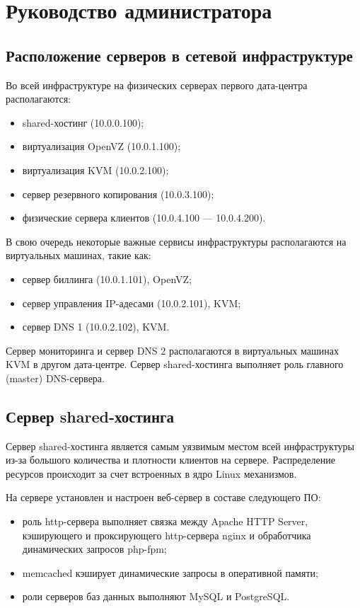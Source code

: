 \section{Руководство администратора}

\subsection{Расположение серверов в сетевой инфраструктуре}
Во всей инфраструктуре на физических серверах первого дата-центра располагаются:
\begin{itemize}
  \item shared-хостинг (10.0.0.100);
  \item виртуализация OpenVZ (10.0.1.100);
  \item виртуализация KVM (10.0.2.100);
  \item сервер резервного копирования (10.0.3.100);
  \item физические сервера клиентов (10.0.4.100 --- 10.0.4.200).
\end{itemize}

В свою очередь некоторые важные сервисы инфраструктуры располагаются на виртуальных машинах, такие как:
\begin{itemize}
  \item сервер биллинга (10.0.1.101), OpenVZ;
  \item сервер управления IP-адесами (10.0.2.101), KVM;
  \item сервер DNS 1 (10.0.2.102), KVM.
\end{itemize}

Сервер мониторинга и сервер DNS 2 располагаются в виртуальных машинах KVM в другом дата-центре.
Сервер shared-хостинга выполняет роль главного (master) DNS-сервера.

\subsection{Сервер shared-хостинга}

Сервер shared-хостинга является самым уязвимым местом всей инфраструктуры из-за большого количества и плотности клиентов на сервере.
Распределение ресурсов происходит за счет встроенных в ядро Linux механизмов.

На сервере установлен и настроен веб-сервер в составе следующего ПО:
\begin{itemize}
  \item роль http-сервера выполняет связка между Apache HTTP Server, кэширующего и проксирующего http-сервера nginx и обработчика динамических запросов php-fpm;
  \item memcached кэширует динамические запросы в оперативной памяти;
  \item роли серверов баз данных выполняют MySQL и PostgreSQL.
\end{itemize}

